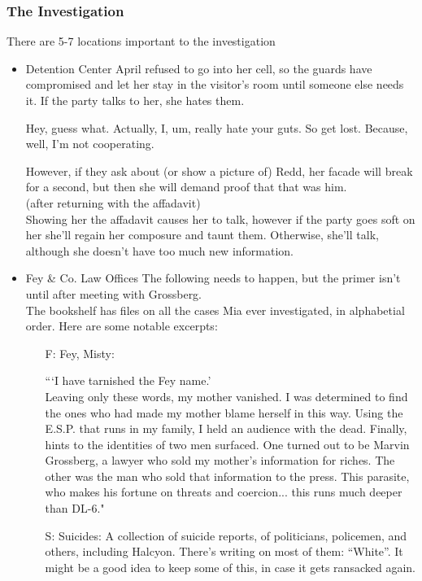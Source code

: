 \subsubsection{The Investigation}
There are 5-7 locations important to the investigation

\begin{itemize}
\item Detention Center
April refused to go into her cell, so the guards have compromised and let her stay in the visitor's room until someone else needs it. If the party talks to her, she hates them.
\begin{center}
Hey, guess what. Actually, I, um, really hate your guts. So get lost. Because, well, I'm not cooperating.
\end{center}
However, if they ask about (or show a picture of) Redd, her facade will break for a second, but then she will demand proof that that was him.\\
(after returning with the affadavit)\\
Showing her the affadavit causes her to talk, however if the party goes soft on her she'll regain her composure and taunt them. Otherwise, she'll talk, although she doesn't have too much new information.


\item Fey \& Co. Law Offices
The following needs to happen, but the primer isn't until after meeting with Grossberg. \\
The bookshelf has files on all the cases Mia ever investigated, in alphabetial order. Here are some notable excerpts:
\begin{itemize}
\item[F:] Fey, Misty:
\begin{center}
```I have tarnished the Fey name.' \\
Leaving only these words, my mother vanished. I was determined to find the ones who had made my mother blame herself in this way. Using the E.S.P. that runs in my family, I held an audience with the dead. Finally, hints to the identities of two men surfaced. One turned out to be Marvin Grossberg, a lawyer who sold my mother's information for riches. The other was the man who sold that information to the press. This parasite, who makes his fortune on threats and coercion... this runs much deeper than DL-6."\end{center}

\item[S:] Suicides:
A collection of suicide reports, of politicians, policemen, and others, including Halcyon. There's writing on most of them: ``White''. It might be a good idea to keep some of this, in case it gets ransacked again.


\end{itemize}
\end{itemize}
